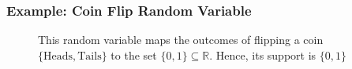 \documentclass[handout]{beamer}
\begin{document}
\begin{frame}
\frametitle{Example: Coin Flip Random Variable}

\begin{figure}
\centering
{}
\caption{This random variable maps the outcomes of flipping a coin $\{\mbox{Heads}, \mbox{Tails}\}$ to the set $\{0,1\}\subseteq \mathbb{R}$. Hence, its support is $\{0,1\}$}
\end{figure}
\end{frame}

% 	 
	
% 	 
% 	 
	
\end{document}
